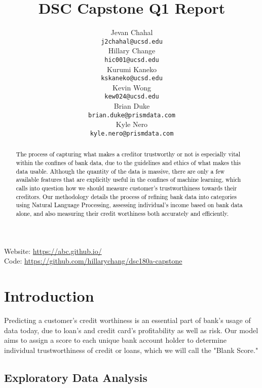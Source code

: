 \documentclass[12pt,letterpaper]{article}
\title{DSC Capstone Q1 Report}
\author{Jevan Chahal\\
  {\tt j2chahal@ucsd.edu} \\\And
  Hillary Change \\
  {\tt hic001@ucsd.edu} \\\And
  Kurumi Kaneko \\
  {\tt kskaneko@ucsd.edu} \\\And
  Kevin Wong \\
  {\tt kew024@ucsd.edu} \\\And
  Brian Duke \\
  {\tt brian.duke@prismdata.com} \\\And
  Kyle Nero \\
  {\tt kyle.nero@prismdata.com} \\}
\begin{document}
\maketitle


\begin{abstract}
    \textcolor{Black}{
    The process of capturing what makes a creditor trustworthy or not is especially vital within the confines of bank data, due to the guidelines and ethics of what makes this data usable. Although the quantity of the data is massive, there are only a few available features that are explicitly useful in the confines of machine learning, which calls into question how we should measure customer's trustworthiness towards their creditors. Our methodology details the process of refining bank data into categories using Natural Language Processing, assessing individual's income based on bank data alone, and also measuring their credit worthiness both accurately and efficiently. 
    }
\end{abstract}

\begin{center}
Website: \url{https://abc.github.io/} \\
Code: \url{https://github.com/hillarychang/dsc180a-capstone}
\end{center}

\maketoc
\clearpage


\section{Introduction}

Predicting a customer's credit worthiness is an essential part of bank's usage of data today, due to loan's and credit card's profitability as well as risk. Our model aims to assign a score to each unique bank account holder to determine individual trustworthiness of credit or loans, which we will call the "Blank Score."

\subsection{Exploratory Data Analysis}
\end{document}

